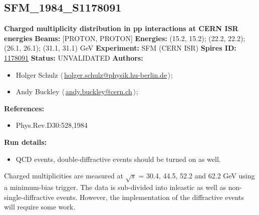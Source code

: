 \subsection[SFM\_1984\_S1178091]{SFM\_1984\_S1178091\,\cite{Breakstone:1983ns}}
\textbf{Charged multiplicity distribution in pp interactions at CERN ISR energies}\newline
\textbf{Beams:} [PROTON, PROTON] \newline
\textbf{Energies:} (15.2, 15.2); (22.2, 22.2); (26.1, 26.1); (31.1, 31.1) GeV \newline
\textbf{Experiment:} SFM (CERN ISR) \newline
\textbf{Spires ID:} \href{http://www.slac.stanford.edu/spires/find/hep/www?rawcmd=key+1178091}{1178091}\newline
\textbf{Status:} UNVALIDATED\newline
\textbf{Authors:}
\begin{itemize}
  \item Holger Schulz $\langle\,$\href{mailto:holger.schulz@physik.hu-berlin.de}{holger.schulz@physik.hu-berlin.de}$\,\rangle$;
  \item Andy Buckley $\langle\,$\href{mailto:andy.buckley@cern.ch}{andy.buckley@cern.ch}$\,\rangle$;
\end{itemize}
\textbf{References:}
\begin{itemize}
  \item Phys.Rev.D30:528,1984
\end{itemize}
\textbf{Run details:}
\begin{itemize}

  \item QCD events, double-diffractive events should be turned on as well.\end{itemize}

\noindent Charged multiplicities are measured at \ensuremath{\sqrt{s}} = 30.4, 44.5, 52.2 and 62.2 GeV using a minimum-bias trigger. The data is sub-divided into inleastic as well as non-single-diffractive events. However, the implementation of the diffractive events will require some work.

\clearpage


